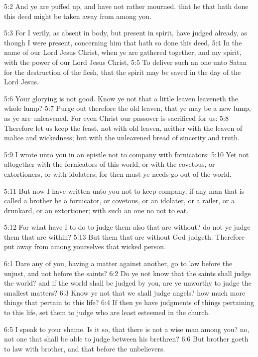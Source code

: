 5:2 And ye are puffed up, and have not rather mourned, that he that
hath done this deed might be taken away from among you.

5:3 For I verily, as absent in body, but present in spirit, have
judged already, as though I were present, concerning him that hath so
done this deed, 5:4 In the name of our Lord Jesus Christ, when ye are
gathered together, and my spirit, with the power of our Lord Jesus
Christ, 5:5 To deliver such an one unto Satan for the destruction of
the flesh, that the spirit may be saved in the day of the Lord Jesus.

5:6 Your glorying is not good. Know ye not that a little leaven
leaveneth the whole lump?  5:7 Purge out therefore the old leaven,
that ye may be a new lump, as ye are unleavened. For even Christ our
passover is sacrificed for us: 5:8 Therefore let us keep the feast,
not with old leaven, neither with the leaven of malice and wickedness;
but with the unleavened bread of sincerity and truth.

5:9 I wrote unto you in an epistle not to company with fornicators:
5:10 Yet not altogether with the fornicators of this world, or with
the covetous, or extortioners, or with idolaters; for then must ye
needs go out of the world.

5:11 But now I have written unto you not to keep company, if any man
that is called a brother be a fornicator, or covetous, or an idolater,
or a railer, or a drunkard, or an extortioner; with such an one no not
to eat.

5:12 For what have I to do to judge them also that are without? do not
ye judge them that are within?  5:13 But them that are without God
judgeth. Therefore put away from among yourselves that wicked person.

6:1 Dare any of you, having a matter against another, go to law before
the unjust, and not before the saints?  6:2 Do ye not know that the
saints shall judge the world? and if the world shall be judged by you,
are ye unworthy to judge the smallest matters?  6:3 Know ye not that
we shall judge angels? how much more things that pertain to this life?
6:4 If then ye have judgments of things pertaining to this life, set
them to judge who are least esteemed in the church.

6:5 I speak to your shame. Is it so, that there is not a wise man
among you? no, not one that shall be able to judge between his
brethren?  6:6 But brother goeth to law with brother, and that before
the unbelievers.

